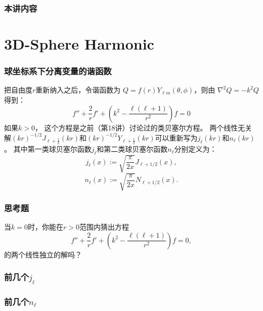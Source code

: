 \documentclass[CJK]{beamer}
\date{}
\begin{document}
\bch  
{}

\begin{frame}
\frametitle{本讲内容}

\tableofcontents
\end{frame}



\section{3D-Sphere Harmonic}


\begin{frame}
  \frametitle{球坐标系下分离变量的谐函数}
  
  把自由度$r$重新纳入之后，令谐函数为 $Q = f(r)Y_{\ell m}(\theta,\phi)$，则由 $\nabla^2Q = -k^2Q$ 得到：
  $$ f''+\frac{2}{r}f'+\left(k^2-\frac{\ell(\ell+1)}{r^2}\right) f = 0 $$
  如果$k> 0$， 这个方程是之前（第18讲）讨论过的类贝塞尔方程。
  两个线性无关解$(kr)^{-1/2}J_{\ell+\frac{1}{2}}(kr)$和$(kr)^{-1/2}Y_{\ell+\frac{1}{2}}(kr)$可以重新写为$ j_\ell(kr)$和$n_{\ell}(kr)$。
  其中第一类球贝塞尔函数$j_\ell$和第二类球贝塞尔函数$n_\ell$分别定义为：{\blue
  $$ j_\ell(x) :=\sqrt{ \frac{\pi}{2x}} J_{\ell+1/2}(x), $$
  $$ n_\ell(x) :=\sqrt{ \frac{\pi}{2x}} N_{\ell+1/2}(x). $$  }
  
\end{frame}

\begin{frame}
  \frametitle{思考题}
  
  
  当$k=0$时，你能在$r>0$范围内猜出方程
  $$ f''+\frac{2}{r}f'+\left(k^2-\frac{\ell(\ell+1)}{r^2}\right) f = 0, $$
  的两个线性独立的解吗？  
\end{frame}


\begin{frame}
  \frametitle{前几个$j_\ell$}
  
  
\end{frame}


\begin{frame}
  \frametitle{前几个$n_\ell$}
  
  
\end{frame}
\end{document}
